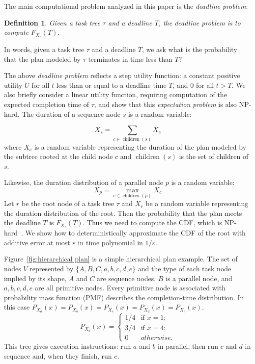 \documentclass[review]{elsarticle}
\newtheorem{definition}{Definition}
\DeclareMathOperator{\ch}{\operatorname{children}}
\begin{document}
The main computational problem analyzed in this paper is the {\em deadline problem}: 
\begin{definition}\label{Def:Deadline}
	Given a task tree $\tau $ and a deadline $T$, the \emph{deadline problem} is to compute $F_{X_\tau}(T)$.
\end{definition}

In words, given a task tree $\tau $ and a deadline $T$, we ask what is the probability that the plan modeled by $\tau$ terminates in time less than $T$?

The above {\em deadline problem} reflects a step utility function: a 
constant positive utility $U$ for all $t$ less than or equal to a deadline 
time $T$, and $0$ for all $t>T$. We also briefly consider a linear utility function, requiring
computation of the expected completion time of $\tau$, and show that this {\em expectation problem} 
is also NP-hard. 
The duration of a sequence node $s$ is a random variable:

$$
X_s = \sum_{c\in \ch(s)} X_c
$$
where $X_c$ is a random variable representing the duration of the plan modeled by the subtree rooted at the child node $c$ and $\ch(s)$ is the set of children of $s$.


Likewise, the duration distribution of a parallel node $p$ is a random variable:
$$
X_p = \max_{c\in \ch(p)} X_c
$$
Let $r$ be the root node of a task tree $\tau$ and $X_r$ be a random variable representing the duration distribution of the root.
Then the probability that the plan meets the deadline $T$ is $F_{X_r}(T)$.
Thus we need to compute the CDF, which is NP-hard~\cite{mohring2001scheduling}. We show how to deterministically approximate the CDF of the root with additive error at most $\varepsilon$ in time polynomial in $1/\varepsilon$.

Figure~\ref{fig:hierarchical plan} is a simple hierarchical plan example. The set of nodes $V$ represented by $\lbrace A,B,C,a,b,c,d,e \rbrace $ and the type of each task node implied by its shape, $A$ and $C$ are sequence nodes, $ B $ is a parallel node, and $ a, b, c, d, e $ are all primitive nodes. Every primitive node is associated with probability mass function (PMF) describes the completion-time distribution. In this case $P_{X_a}(x)=P_{X_b}(x)=P_{X_c}(x)=P_{X_d}(x)=P_{X_e}(x)$.
$$P_{X_a}(x)=
\begin{cases}
1/4 & \text{if } x=1; \\
3/4 & \text{if } x=4; \\
0 & otherwise.
\end{cases}$$
This tree gives execution instructions: run $a$ and $b$ in parallel, then run $c$ and $d$ in sequence and, when they finish, run $e$.
\end{document}
